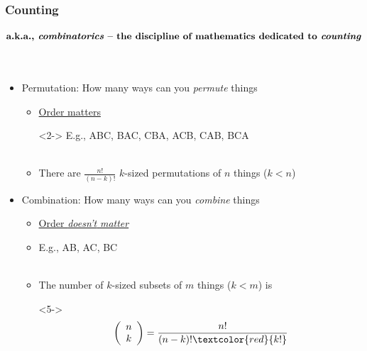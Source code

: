 \documentclass[xcolor={dvipsnames}]{beamer}
\begin{document}
\frame
{
 \frametitle{Counting}
\footnotesize
$\textbf{a.k.a., \emph{combinatorics} -- the discipline of mathematics dedicated to \emph{counting}}$\\${}$\\${}$\\

\normalsize
\begin{itemize}
\item Permutation: How many ways can you \emph{permute} things\\
\begin{itemize}
\item<2->[] \underline{Order matters}\\
\item[]<2-> E.g., ABC, BAC, CBA, ACB, CAB, BCA \\${}$\\
\item<3-> There are $\frac{n!}{(n-k)!}$ $k$-sized permutations of $n$ things ($k < n$)
\end{itemize}
\item[]
\item Combination: How many ways can you \emph{combine} things
\begin{itemize}
\item<4->[] \underline{Order \emph{doesn't} \emph{matter}}\\
\item<4->[] E.g., AB, AC, BC \\${}$\\
\item<5-> The number of $k$-sized subsets of $m$ things ($k < m$) is
\item[]<5-> $$\left(\begin{array}{c}n\\k\end{array}\right) = \frac{n!}{(n-k)!\textcolor{red}{k!}}$$
\end{itemize}
\end{itemize}
}
\end{document}

